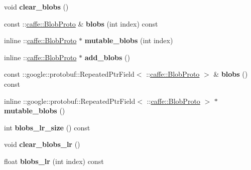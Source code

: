 \begin{DoxyCompactItemize}
void {\bfseries clear\+\_\+blobs} ()
\item 
\mbox{\label{classcaffe_1_1_v0_layer_parameter_a437115b3cdec611c36861d8e08bd9c54}} 
const \+::\mbox{\hyperlink{classcaffe_1_1_blob_proto}{caffe\+::\+Blob\+Proto}} \& {\bfseries blobs} (int index) const
\item 
\mbox{\label{classcaffe_1_1_v0_layer_parameter_a0ac0fafd887ce7cbf1d666bfbe873dff}} 
inline \+::\mbox{\hyperlink{classcaffe_1_1_blob_proto}{caffe\+::\+Blob\+Proto}} $\ast$ {\bfseries mutable\+\_\+blobs} (int index)
\item 
\mbox{\label{classcaffe_1_1_v0_layer_parameter_a3628b206e4bfc282cc63482ea0402159}} 
inline \+::\mbox{\hyperlink{classcaffe_1_1_blob_proto}{caffe\+::\+Blob\+Proto}} $\ast$ {\bfseries add\+\_\+blobs} ()
\item 
\mbox{\label{classcaffe_1_1_v0_layer_parameter_a97a6181b76c24e281876a865e5f38004}} 
const \+::google\+::protobuf\+::\+Repeated\+Ptr\+Field$<$ \+::\mbox{\hyperlink{classcaffe_1_1_blob_proto}{caffe\+::\+Blob\+Proto}} $>$ \& {\bfseries blobs} () const
\item 
\mbox{\label{classcaffe_1_1_v0_layer_parameter_a02f7e1e75c895f0ec9b80e0639482f27}} 
inline \+::google\+::protobuf\+::\+Repeated\+Ptr\+Field$<$ \+::\mbox{\hyperlink{classcaffe_1_1_blob_proto}{caffe\+::\+Blob\+Proto}} $>$ $\ast$ {\bfseries mutable\+\_\+blobs} ()
\item 
\mbox{\label{classcaffe_1_1_v0_layer_parameter_a7ab076ab3bcb72e9f088cbc7214a4631}} 
int {\bfseries blobs\+\_\+lr\+\_\+size} () const
\item 
\mbox{\label{classcaffe_1_1_v0_layer_parameter_a622a4b4bd76826cf3f0439e8146c8699}} 
void {\bfseries clear\+\_\+blobs\+\_\+lr} ()
\item 
\mbox{\label{classcaffe_1_1_v0_layer_parameter_a7bec2c4beb6cbcbbced7aea2405f8206}} 
float {\bfseries blobs\+\_\+lr} (int index) const
\item 

\end{DoxyCompactItemize}
